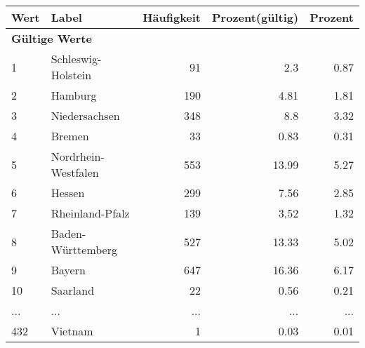      \begin{longtable}{lXrrr}
     \toprule
     \textbf{Wert} & \textbf{Label} & \textbf{Häufigkeit} & \textbf{Prozent(gültig)} & \textbf{Prozent} \\
     \endhead
     \midrule
     \multicolumn{5}{l}{\textbf{Gültige Werte}}\\
        1 & \multicolumn{1}{X}{Schleswig-Holstein} & %
          \num{91} &
          \num[round-mode=places,round-precision=2]{2.3} &
          \num[round-mode=places,round-precision=2]{0.87} \\
        2 & \multicolumn{1}{X}{Hamburg} & %
          \num{190} &
          \num[round-mode=places,round-precision=2]{4.81} &
          \num[round-mode=places,round-precision=2]{1.81} \\
        3 & \multicolumn{1}{X}{Niedersachsen} & %
          \num{348} &
          \num[round-mode=places,round-precision=2]{8.8} &
          \num[round-mode=places,round-precision=2]{3.32} \\
        4 & \multicolumn{1}{X}{Bremen} & %
          \num{33} &
          \num[round-mode=places,round-precision=2]{0.83} &
          \num[round-mode=places,round-precision=2]{0.31} \\
        5 & \multicolumn{1}{X}{Nordrhein-Westfalen} & %
          \num{553} &
          \num[round-mode=places,round-precision=2]{13.99} &
          \num[round-mode=places,round-precision=2]{5.27} \\
        6 & \multicolumn{1}{X}{Hessen} & %
          \num{299} &
          \num[round-mode=places,round-precision=2]{7.56} &
          \num[round-mode=places,round-precision=2]{2.85} \\
        7 & \multicolumn{1}{X}{Rheinland-Pfalz} & %
          \num{139} &
          \num[round-mode=places,round-precision=2]{3.52} &
          \num[round-mode=places,round-precision=2]{1.32} \\
        8 & \multicolumn{1}{X}{Baden-Württemberg} & %
          \num{527} &
          \num[round-mode=places,round-precision=2]{13.33} &
          \num[round-mode=places,round-precision=2]{5.02} \\
        9 & \multicolumn{1}{X}{Bayern} & %
          \num{647} &
          \num[round-mode=places,round-precision=2]{16.36} &
          \num[round-mode=places,round-precision=2]{6.17} \\
        10 & \multicolumn{1}{X}{Saarland} & %
          \num{22} &
          \num[round-mode=places,round-precision=2]{0.56} &
          \num[round-mode=places,round-precision=2]{0.21} \\
       ... & ... & ... & ... & ... \\
        432 & \multicolumn{1}{X}{Vietnam} & %
          \num{1} &
          \num[round-mode=places,round-precision=2]{0.03} &
          \num[round-mode=places,round-precision=2]{0.01} \\


\end{longtable}

